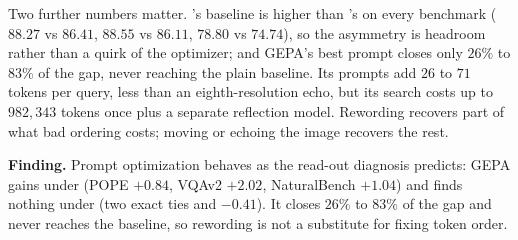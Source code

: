 Two further numbers matter. \sit{}'s baseline is higher than \sti{}'s on every
benchmark ($88.27$ vs $86.41$, $88.55$ vs $86.11$, $78.80$ vs $74.74$), so the
asymmetry is headroom rather than a quirk of the optimizer; and GEPA's best
\sti{} prompt closes only $26\%$ to $83\%$ of the gap, never reaching the plain
\sit{} baseline. Its prompts add $26$ to $71$ tokens per query, less than an
eighth-resolution echo, but its search costs up to $982{,}343$ tokens once plus
a separate reflection model. Rewording recovers part of what bad ordering costs;
moving or echoing the image recovers the rest.

\begin{finding}
\textbf{Finding.} Prompt optimization behaves as the read-out diagnosis
predicts: GEPA gains under \sti{} (POPE $+0.84$, VQAv2 $+2.02$, NaturalBench
$+1.04$) and finds nothing under \sit{} (two exact ties and $-0.41$). It closes
$26\%$ to $83\%$ of the gap and never reaches the \sit{} baseline, so rewording
is not a substitute for fixing token order.
\end{finding}
